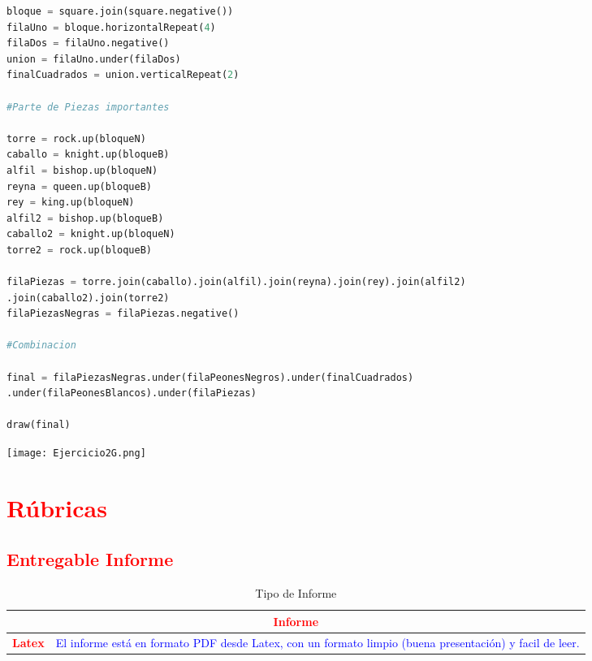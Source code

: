 \documentclass{article}
\begin{document}
\begin{itemize}
\begin{lstlisting}[language=Python, caption=EJERCICIO 2-G]
bloque = square.join(square.negative())
filaUno = bloque.horizontalRepeat(4)
filaDos = filaUno.negative()
union = filaUno.under(filaDos)
finalCuadrados = union.verticalRepeat(2)

#Parte de Piezas importantes

torre = rock.up(bloqueN)
caballo = knight.up(bloqueB)
alfil = bishop.up(bloqueN)
reyna = queen.up(bloqueB)
rey = king.up(bloqueN)
alfil2 = bishop.up(bloqueB)
caballo2 = knight.up(bloqueN)
torre2 = rock.up(bloqueB)

filaPiezas = torre.join(caballo).join(alfil).join(reyna).join(rey).join(alfil2)
.join(caballo2).join(torre2) 
filaPiezasNegras = filaPiezas.negative()

#Combinacion

final = filaPiezasNegras.under(filaPeonesNegros).under(finalCuadrados)
.under(filaPeonesBlancos).under(filaPiezas)

draw(final)    
            \end{lstlisting}  
            \texttt{[image: Ejercicio2G.png]}
            \newline \newline \newline

	\end{itemize}	
    \clearpage

	\section{\textcolor{red}{Rúbricas}}
	
	\subsection{\textcolor{red}{Entregable Informe}}
	\begin{table}[H]
		\caption{Tipo de Informe}
		\setlength{\tabcolsep}{0.5em} %
		{\renewcommand{\arraystretch}{1.5}%
		\begin{tabular}{|p{3cm}|p{12cm}|}
			\hline
			\multicolumn{2}{|c|}{\textbf{\textcolor{red}{Informe}}}  \\
			\hline 
			\textbf{\textcolor{red}{Latex}} & \textcolor{blue}{El informe está en formato PDF desde Latex,  con un formato limpio (buena presentación) y facil de leer.}   \\ 
			\hline 
			
			
		\end{tabular}
	}
	\end{table}
	
\end{document}
